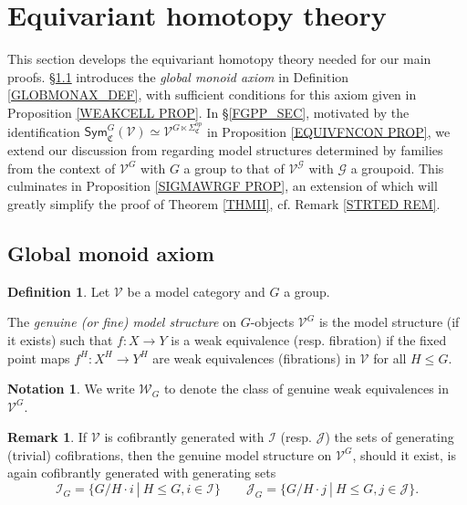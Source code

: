 \documentclass[a4paper,10pt
]{article}%
\numberwithin{equation}{section}
\numberwithin{figure}{section}
\theoremstyle{definition} %
\newtheorem{definition}[equation]{Definition}%
\newtheorem{remark}[equation]{Remark}%
\newtheorem{notation}[equation]{Notation}%
\newcommand{\V}{\ensuremath{\mathcal V}}
\newcommand{\G}{\ensuremath{\mathcal G}}
\newcommand{\1}{\ensuremath{\mathbbm 1}}%
\begin{document}
\section{Equivariant homotopy theory}
\label{EHT_SEC}

This section develops the 
equivariant homotopy theory 
needed for our main proofs.
\S \ref{GMA_SEC} introduces the \emph{global monoid axiom}
in Definition \ref{GLOBMONAX_DEF}, 
with sufficient conditions for this axiom given in 
Proposition \ref{WEAKCELL PROP}.
In \S \ref{FGPP_SEC},
motivated by the identification
$\mathsf{Sym}^{G}_{\mathfrak{C}}(\V)
\simeq \V^{G \ltimes \Sigma^{op}_{\mathfrak{C}}}$
in Proposition \ref{EQUIVFNCON PROP}, 
we extend our discussion 
from \cite[\S 6]{BP21}
regarding model structures determined by families
from the context of $\V^G$ with $G$ a group to that of
$\V^{\G}$ with $\G$ a groupoid.
This culminates in Proposition \ref{SIGMAWRGF PROP}, an extension of \cite[Prop. 6.25]{BP21}
which will greatly simplify the proof of Theorem \ref{THMII},
cf. Remark \ref{STRTED REM}.


\subsection{Global monoid axiom}
\label{GMA_SEC}



\begin{definition}\label{GENMOD DEF}
	Let $\V$ be a model category and $G$ a group.
	
	The \emph{genuine (or fine) model structure} on $G$-objects $\V^G$
	is the model structure (if it exists)
	such that
	$f\colon X \to Y$
	is a weak equivalence (resp. fibration)
	if the fixed point maps
	$f^H\colon X^H \to Y^H$
	are weak equivalences (fibrations) in $\V$
	for all $H \leq G$.
\end{definition}


\begin{notation}
	We write $\mathcal{W}_G$
	to denote the class of genuine weak equivalences in $\V^G$.
\end{notation}


\begin{remark}
	If $\V$ is cofibrantly generated with 
	$\mathcal{I}$ (resp. $\mathcal{J}$)
	the sets of generating (trivial) cofibrations,
	then the genuine model structure on $\V^G$,
	should it exist,
	is again cofibrantly generated with generating sets
	\begin{equation}\label{GENGENSETEQ}
	\mathcal{I}_G = \{G/H \cdot i \ | \ H\leq G,i\in \mathcal{I}\}
	\qquad
	\mathcal{J}_G = \{G/H \cdot j \ | \ H\leq G,j\in \mathcal{J}\}.
	\end{equation}
\end{remark}
\end{document}
